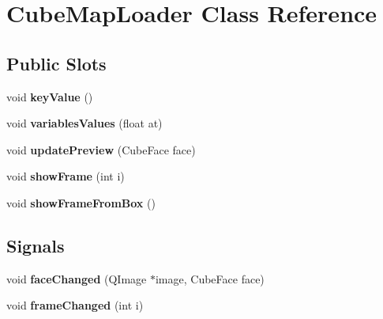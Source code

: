 \hypertarget{class_cube_map_loader}{
\section{\-Cube\-Map\-Loader \-Class \-Reference}
\label{class_cube_map_loader}
}
\subsection*{\-Public \-Slots}
\begin{DoxyCompactItemize}
\item 
\hypertarget{class_cube_map_loader_ad300dc5c243abfe3bf7130b766d07b11}{
void {\bfseries key\-Value} ()}
\label{class_cube_map_loader_ad300dc5c243abfe3bf7130b766d07b11}

\item 
\hypertarget{class_cube_map_loader_a8226f9fd8a65153da629f2228feb57dd}{
void {\bfseries variables\-Values} (float at)}
\label{class_cube_map_loader_a8226f9fd8a65153da629f2228feb57dd}

\item 
\hypertarget{class_cube_map_loader_ac9e69c70d6f790d0a2c4bc64ca56b4fa}{
void {\bfseries update\-Preview} (\-Cube\-Face face)}
\label{class_cube_map_loader_ac9e69c70d6f790d0a2c4bc64ca56b4fa}

\item 
\hypertarget{class_cube_map_loader_a5d95c6d48dd3e39ddacf2f48e0636f21}{
void {\bfseries show\-Frame} (int i)}
\label{class_cube_map_loader_a5d95c6d48dd3e39ddacf2f48e0636f21}

\item 
\hypertarget{class_cube_map_loader_ac5885591b80909e6e85d81aefdbec5a1}{
void {\bfseries show\-Frame\-From\-Box} ()}
\label{class_cube_map_loader_ac5885591b80909e6e85d81aefdbec5a1}

\end{DoxyCompactItemize}
\subsection*{\-Signals}
\begin{DoxyCompactItemize}
\item 
\hypertarget{class_cube_map_loader_a3c5aad99c857a88401b0ca6e8719f9c0}{
void {\bfseries face\-Changed} (\-Q\-Image $\ast$image, \-Cube\-Face face)}
\label{class_cube_map_loader_a3c5aad99c857a88401b0ca6e8719f9c0}

\item 
\hypertarget{class_cube_map_loader_a1112d0dec98f132e98dd732a40693a97}{
void {\bfseries frame\-Changed} (int i)}
\label{class_cube_map_loader_a1112d0dec98f132e98dd732a40693a97}

\end{DoxyCompactItemize}
